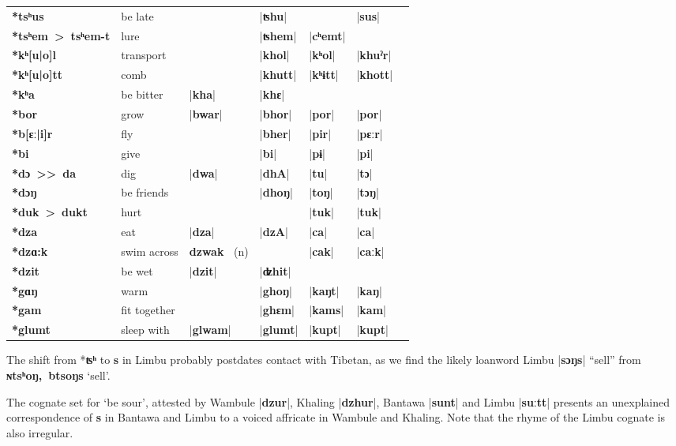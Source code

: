 \documentclass[oldfontcommands,oneside,a4paper,11pt]{article}
\newcommand{\ipa}[1]{\textbf{{\phon\mbox{#1}}}} %
\newcommand{\dhatu}[2]{|\ipa{#1}| ``#2''}
\newcommand{\dhat}[1]{|\ipa{#1}|}
\begin{document}
\begin{table}[H]
\begin{tabular}{lllllll}
\ipa{*tsʰus} &	be late &	&	\dhat{ʦhu} &	&	\dhat{sus} &	\\
\ipa{*tsʰem > tsʰem-t} &	lure &	&	\dhat{ʦhem} &	\dhat{cʰemt} &	&	\\
\midrule
\ipa{*kʰ[u|o]l} &	transport &	&	\dhat{khol} &	\dhat{kʰol} &	\dhat{khuˀr} &	\\
\ipa{*kʰ[u|o]tt} &	comb &	&	\dhat{khutt} &	\dhat{kʰɨtt} &	\dhat{khott} &	\\
\ipa{*kʰa} &	be bitter &	\dhat{kha} &	\dhat{khɛ} &	&	&	\\
\midrule
\ipa{*bor} &	grow &	\dhat{bwar} &	\dhat{bhor} &	\dhat{por} &	\dhat{por} &	\\
\ipa{*b[ɛː|i]r} &	fly &	&	\dhat{bher} &	\dhat{pir} &	\dhat{pɛːr} &	\\
\ipa{*bi} &	give &	&	\dhat{bi} &	\dhat{pɨ} &	\dhat{pi} &	\\
\midrule
\ipa{*dɔ >{}>  da} &	dig &	\dhat{dwa} &	\dhat{dhA} &	\dhat{tu} &	\dhat{tɔ} &	\\
\ipa{*dɔŋ} &	be friends &	&	\dhat{dhoŋ} &	\dhat{toŋ} &	\dhat{tɔŋ} &	\\
\ipa{*duk > dukt} &	hurt &	&	&	\dhat{tuk} &	\dhat{tuk} &	\\
\midrule				
\ipa{*dza} &	eat &	\dhat{dza} &	\dhat{dzA} &	\dhat{ca} &	\dhat{ca} &	\\
\ipa{*dzɑ:k} &	swim across &	\ipa{dzwak } (n) &	&	\dhat{cak} &	\dhat{caːk} &	\\
\ipa{*dzit} &	be wet &	\dhat{dzit}   &	\dhat{ʣhit} &	&	&	\\
\midrule		
\ipa{*gɑŋ} &	warm &	&	\dhat{ghoŋ} &	\dhat{kaŋt} &	\dhat{kaŋ} &	\\
\ipa{*gam} &	fit together &	&	\dhat{ghɛm} &	\dhat{kams} &	\dhat{kam} &	\\
\ipa{*glumt} &	sleep with &	\dhat{glwam} &	\dhat{glumt} &	\dhat{kupt} &	\dhat{kupt} &	\\
\bottomrule
\end{tabular}
\end{table}

The shift from *\ipa{ʦʰ} to \ipa{s} in Limbu probably postdates contact with Tibetan, as we find the likely loanword Limbu \dhatu{sɔŋs}{sell} from \ipa{ɴtsʰoŋ, btsoŋs} `sell'.


The cognate set for `be sour', attested by Wambule |\ipa{dzur}|, Khaling |\ipa{dzhur}|, Bantawa |\ipa{sunt}| and Limbu |\ipa{suːtt}| presents an unexplained correspondence of \ipa{s} in Bantawa and Limbu to a voiced affricate in Wambule and Khaling. Note that the rhyme of the Limbu cognate is also irregular.
\end{document}
